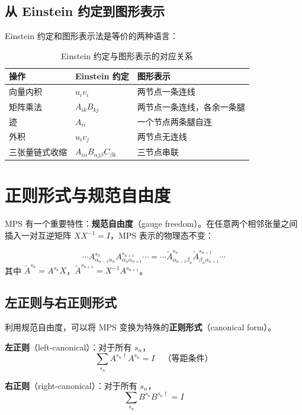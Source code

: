 \documentclass[12pt,a4paper]{ctexart}
\begin{document}
\subsection{从 Einstein 约定到图形表示}

Einstein 约定和图形表示法是等价的两种语言：

\begin{table}[H]
\centering
\begin{tabular}{lll}
\toprule
\textbf{操作} & \textbf{Einstein 约定} & \textbf{图形表示} \\
\midrule
向量内积 & $u_i v_i$ & 两节点一条连线 \\
矩阵乘法 & $A_{ik} B_{kj}$ & 两节点一条连线，各余一条腿 \\
迹 & $A_{ii}$ & 一个节点两条腿自连 \\
外积 & $u_i v_j$ & 两节点无连线 \\
三张量链式收缩 & $A_{i\alpha} B_{\alpha j \beta} C_{\beta k}$ & 三节点串联 \\
\bottomrule
\end{tabular}
\caption{Einstein 约定与图形表示的对应关系}
\end{table}

\section{正则形式与规范自由度}

MPS 有一个重要特性：\textbf{规范自由度}（gauge freedom）。在任意两个相邻张量之间插入一对互逆矩阵 $X X^{-1} = I$，MPS 表示的物理态不变：

\begin{equation}
\cdots A^{s_n}_{\alpha_{n-1}\alpha_n} A^{s_{n+1}}_{\alpha_n \alpha_{n+1}} \cdots
= \cdots \tilde{A}^{s_n}_{\alpha_{n-1}\beta_n} \tilde{A}^{s_{n+1}}_{\beta_n \alpha_{n+1}} \cdots
\end{equation}
其中 $\tilde{A}^{s_n} = A^{s_n} X$，$\tilde{A}^{s_{n+1}} = X^{-1} A^{s_{n+1}}$。

\subsection{左正则与右正则形式}

利用规范自由度，可以将 MPS 变换为特殊的\textbf{正则形式}（canonical form）。

\begin{keybox}[正则条件]
\textbf{左正则}（left-canonical）：对于所有 $s_n$，
\[
\sum_{s_n} A^{s_n \dagger} A^{s_n} = I \quad \text{（等距条件）}
\]

\textbf{右正则}（right-canonical）：对于所有 $s_n$，
\[
\sum_{s_n} B^{s_n} B^{s_n \dagger} = I
\]
\end{keybox}
\end{document}

